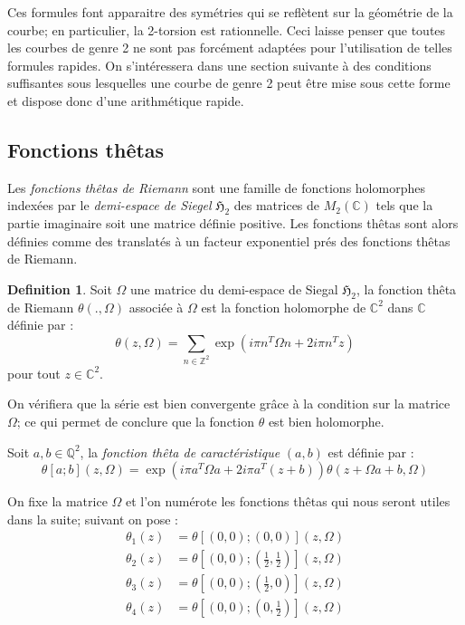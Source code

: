 \documentclass[a4paper]{article}
\theoremstyle{definition}
\newtheorem{definition}{Definition}[section]
\theoremstyle{remark}
\numberwithin{equation}{section}
\begin{document}
Ces formules font apparaitre des symétries qui se reflètent sur la géométrie de la courbe; en particulier, la 2-torsion est rationnelle. Ceci laisse penser que toutes les courbes de genre 2 ne sont pas forcément adaptées pour l'utilisation de telles formules rapides. On s'intéressera dans une section suivante à des conditions suffisantes sous lesquelles une courbe de genre 2 peut être mise sous cette forme et dispose donc d'une arithmétique rapide. 

\subsection{Fonctions thêtas}
Les \emph{fonctions thêtas de Riemann} sont une famille de fonctions holomorphes indexées par le \emph{demi-espace de Siegel} $\mathfrak{H}_2$ des matrices de $M_2(\mathbb{C})$ tels que la partie imaginaire soit une matrice définie positive. Les fonctions thêtas sont alors définies comme des translatés à un facteur exponentiel prés des fonctions thêtas de Riemann.

\begin{definition}
Soit $\Omega$ une matrice du demi-espace de Siegal $\mathfrak{H}_2$, la fonction thêta de Riemann $\theta(.,\Omega)$ associée à $\Omega$ est la fonction holomorphe de $\mathbb{C}^2$ dans $\mathbb{C}$ définie par :
$$\theta(z,\Omega) = \sum_{n \in \mathbb{Z}^2}{\exp(i\pi n^T \Omega n + 2i\pi n^T z)}$$
pour tout $z \in \mathbb{C}^2$.

On vérifiera que la série est bien convergente grâce à la condition sur la matrice $\Omega$; ce qui permet de conclure que la fonction $\theta$ est bien holomorphe.

Soit $a,b \in \mathbb{Q}^2$, la \emph{fonction thêta de caractéristique} $(a,b)$ est définie par :
$$\theta[a;b](z,\Omega) = \exp(i\pi a^T\Omega a + 2i\pi a^T(z+b))\theta(z + \Omega a + b, \Omega)$$
\end{definition}

On fixe la matrice $\Omega$ et l'on numérote les fonctions thêtas qui nous seront utiles dans la suite; suivant \citet{gaudry} on pose :
\begin{align*}
\theta_1(z) &= \theta[(0,0);(0,0)](z,\Omega) \\
\theta_2(z) &= \theta[(0,0);(\frac{1}{2},\frac{1}{2})](z,\Omega) \\
\theta_3(z) &= \theta[(0,0);(\frac{1}{2},0)](z,\Omega) \\
\theta_4(z) &= \theta[(0,0);(0,\frac{1}{2})](z,\Omega)
\end{align*}
\end{document}
